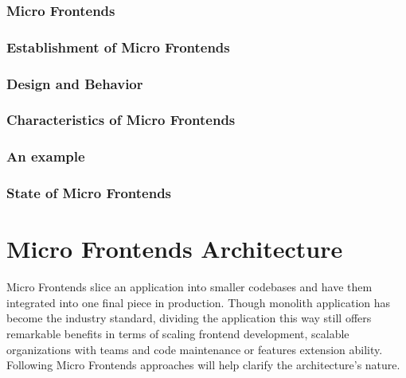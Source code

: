 \documentclass[a4paper]{book}
\begin{document}
\subsection{Micro Frontends}
\subsection{Establishment of Micro Frontends}
\subsection{Design and Behavior}
\subsection{Characteristics of Micro Frontends}
\subsection{An example}
\subsection{State of Micro Frontends}
 
\chapter{Micro Frontends Architecture}
Micro Frontends slice an application into smaller codebases and have them integrated into one final piece in production. Though monolith application has become the industry standard, dividing the application this way still offers remarkable benefits in terms of scaling frontend development, scalable organizations with teams and code maintenance or features extension ability. Following Micro Frontends approaches will help clarify the architecture’s nature.
\end{document}
